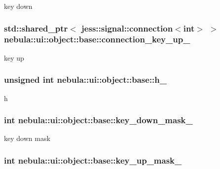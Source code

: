 key down \hypertarget{classnebula_1_1ui_1_1object_1_1base_afbb81761ef556b5d9c05db9b1c1389f0}{
\subsubsection[{connection\_\-key\_\-up\_\-}]{\setlength{\rightskip}{0pt plus 5cm}std::shared\_\-ptr$<$ jess::signal::connection$<$int$>$ $>$ {\bf nebula::ui::object::base::connection\_\-key\_\-up\_\-}}}
\label{classnebula_1_1ui_1_1object_1_1base_afbb81761ef556b5d9c05db9b1c1389f0}


key up \hypertarget{classnebula_1_1ui_1_1object_1_1base_a9f52327e70342132d782504288b650bf}{
\subsubsection[{h\_\-}]{\setlength{\rightskip}{0pt plus 5cm}unsigned int {\bf nebula::ui::object::base::h\_\-}}}
\label{classnebula_1_1ui_1_1object_1_1base_a9f52327e70342132d782504288b650bf}


h \hypertarget{classnebula_1_1ui_1_1object_1_1base_a0be685b1e1f6ad0c51d0a605e241cc50}{
\subsubsection[{key\_\-down\_\-mask\_\-}]{\setlength{\rightskip}{0pt plus 5cm}int {\bf nebula::ui::object::base::key\_\-down\_\-mask\_\-}}}
\label{classnebula_1_1ui_1_1object_1_1base_a0be685b1e1f6ad0c51d0a605e241cc50}


key down mask \hypertarget{classnebula_1_1ui_1_1object_1_1base_aa50a040968d4027b1371082520d370fc}{
\subsubsection[{key\_\-up\_\-mask\_\-}]{\setlength{\rightskip}{0pt plus 5cm}int {\bf nebula::ui::object::base::key\_\-up\_\-mask\_\-}}}
\label{classnebula_1_1ui_1_1object_1_1base_aa50a040968d4027b1371082520d370fc}


